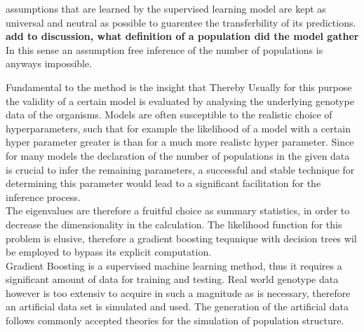 \documentclass[a4paper, 11pt]{article}
\begin{document}
assumptions that are learned by the supervised learning model are kept as universal and neutral as possible to guarentee the transferbility of its predictions.
\textbf{add to discussion, what definition of a population did the model gather}
In this sense an assumption free inference of the number of populations is anyways impossible.

Fundamental to the method is the insight that 
Thereby Usually for this purpose the validity of a certain model is evaluated by analysing the underlying genotype data of the organisms. Models are often susceptible to the realistic choice of hyperparameters, such that for example the likelihood of a model with a certain hyper parameter greater is than for a much more realistc hyper parameter. Since for many models the declaration of the number of populations in the given data is crucial to infer the remaining parameters, a successful and stable technique for determining this parameter would lead to a significant facilitation for the inference process.  \\
  The eigenvalues are therefore a fruitful choice as summary statistics, in order to decrease the dimensionality in the calculation. The likelihood function for this problem is elusive, therefore a gradient boosting tequnique with decision trees wil be employed to bypass its explicit computation. \\
Gradient Boosting is a supervised machine learning method, thus it requires a significant amount of data for training and testing. Real world genotype data however is too extensiv to acquire in such a magnitude as is necessary, therefore an artificial data set is simulated and used. The generation of the artificial data follows commonly accepted theories for the simulation of population structure.
\end{document}
